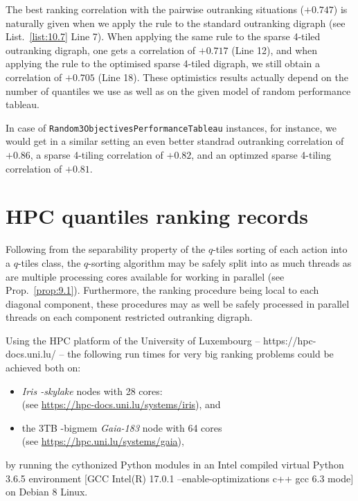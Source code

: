 The best ranking correlation with the pairwise outranking situations ($+0.747$) is naturally given when we apply the \Copeland rule to the standard outranking digraph (see List.~\vref{list:10.7} Line 7). When applying the same rule to the sparse 4-tiled outranking digraph, one gets a correlation of $+0.717$ (Line 12), and when applying the \Copeland rule to the optimised sparse 4-tiled digraph, we still obtain a correlation of $+0.705$ (Line 18). These optimistics results actually depend on the number of quantiles we use as well as on the given model of random performance tableau.

In case of \texttt{Random3ObjectivesPerformanceTableau} instances, for instance, we would get in a similar setting an even better standrad outranking correlation of $+0.86$, a sparse 4-tiling correlation of $+0.82$, and an optimzed sparse 4-tiling correlation of $+0.81$.

\section{HPC quantiles ranking records}
\label{sec:11.5}

Following from the separability property of the $q$-tiles sorting of each action into a $q$-tiles class, the $q$-sorting algorithm may be safely split into as much threads as are multiple processing cores available for working in parallel (see Prop.~\ref{prop:9.1}). Furthermore, the ranking procedure being local to each diagonal component, these procedures may as well be safely processed in parallel threads on each component restricted outranking digraph.

Using the HPC platform of the University of Luxembourg -- https://hpc-docs.uni.lu/ \citep{UNI-2014}-- the following run times for very big ranking problems could be achieved both on:
\begin{itemize}[topsep=1pt]
\item \emph{Iris -skylake} nodes with 28 cores:\\
  (see \href{https://hpc-docs.uni.lu/systems/iris/}{https://hpc-docs.uni.lu/systems/iris}), and
\item the 3TB -bigmem \emph{Gaia-183} node with 64 cores \\
  (see \href{https://hpc.uni.lu/systems/gaia/}{https://hpc.uni.lu/systems/gaia}),
\end{itemize}
by running the cythonized Python modules in an Intel compiled virtual Python 3.6.5 environment [GCC Intel(R) 17.0.1 –enable-optimizations c++ gcc 6.3 mode] on Debian 8 Linux.


